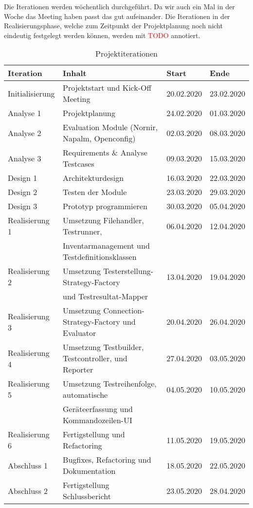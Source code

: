 \documentclass[
	ngerman,
	toc=listof, %
	toc=bibliography, %
	footnotes=multiple, %
	parskip=half, %
	numbers=noendperiod %
]{scrartcl}
\begin{document}
		Die Iterationen werden wöchentlich durchgeführt.
		Da wir auch ein Mal in der Woche das Meeting haben passt das gut aufeinander.
		Die Iterationen in der Realisierungsphase, welche zum Zeitpunkt der Projektplanung noch nicht eindeutig festgelegt werden können, werden mit \textcolor{red}{TODO} annotiert.

		\begin{table}[!h]
			\begin{tabularx}{\textwidth}{lXll}
				\toprule
				Iteration & Inhalt & Start & Ende \\
				\midrule
				Initialisierung & Projektstart und Kick-Off Meeting & 20.02.2020 & 23.02.2020 \\
				\midrule
				Analyse 1 & Projektplanung & 24.02.2020 & 01.03.2020 \\
				Analyse 2 & Evaluation Module (Nornir, Napalm, Openconfig) & 02.03.2020 & 08.03.2020 \\
				Analyse 3 & Requirements \& Analyse Testcases & 09.03.2020 & 15.03.2020 \\
				\midrule
				Design 1 & Architekturdesign & 16.03.2020 & 22.03.2020 \\
				Design 2 & Testen der Module & 23.03.2020 & 29.03.2020 \\
				Design 3 & Prototyp programmieren & 30.03.2020 & 05.04.2020 \\
				\midrule
				Realisierung 1 & Umsetzung Filehandler, Testrunner,  & 06.04.2020 & 12.04.2020 \\
				 & Inventarmanagement und Testdefinitionsklassen & & \\
				Realisierung 2 & Umsetzung Testerstellung-Strategy-Factory & 13.04.2020 & 19.04.2020 \\
				 & und Testresultat-Mapper & & \\
				Realisierung 3 & Umsetzung Connection-Strategy-Factory und Evaluator & 20.04.2020 & 26.04.2020 \\
				Realisierung 4 & Umsetzung Testbuilder, Testcontroller, und Reporter & 27.04.2020 & 03.05.2020 \\
				Realisierung 5 & Umsetzung Testreihenfolge, automatische  & 04.05.2020 & 10.05.2020 \\
				 & Geräteerfassung und Kommandozeilen-UI & & \\
				Realisierung 6 & Fertigstellung und Refactoring & 11.05.2020 & 19.05.2020 \\
				\midrule
				Abschluss 1 & Bugfixes, Refactoring und Dokumentation & 18.05.2020 & 22.05.2020\\
				Abschluss 2 & Fertigstellung Schlussbericht & 23.05.2020 & 28.04.2020\\
				\bottomrule
			\end{tabularx}
			\caption{Projektiterationen}
		\end{table}
		\newpage
\end{document}
